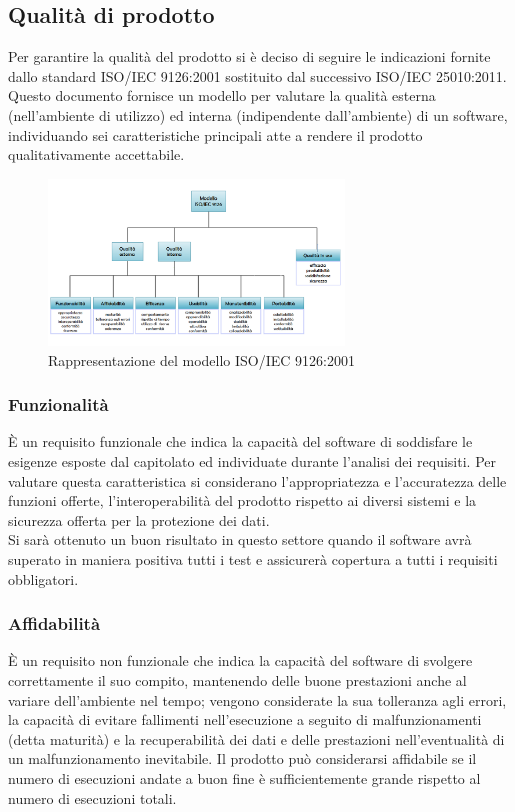 \subsection{Qualità di prodotto}
Per garantire la qualità del prodotto si è deciso di seguire le indicazioni fornite dallo standard ISO/IEC 9126:2001 sostituito dal successivo ISO/IEC 25010:2011. Questo documento fornisce un modello per valutare la qualità esterna (nell’ambiente di utilizzo) ed interna (indipendente dall’ambiente) di un software, individuando sei caratteristiche principali atte a rendere il prodotto qualitativamente accettabile.

\begin{figure}[h]
  \centering
    \includegraphics[width=0.7\textwidth]{./images/ISO-IEC_9126}
  \caption{Rappresentazione del modello ISO/IEC 9126:2001}
  \label{fig:ISO-IEC_9126}
\end{figure}


\subsubsection{Funzionalità}
È un requisito funzionale che indica la capacità del software di soddisfare le esigenze esposte dal capitolato ed individuate durante l’analisi dei requisiti. Per valutare questa caratteristica si considerano l'appropriatezza e l'accuratezza delle funzioni offerte, l'interoperabilità del prodotto rispetto ai diversi sistemi e la sicurezza offerta per la protezione dei dati.\\ 
Si sarà ottenuto un buon risultato in questo settore quando il software avrà superato in maniera positiva tutti i test e assicurerà copertura a tutti i requisiti obbligatori.

\subsubsection{Affidabilità}
È un requisito non funzionale che indica la capacità del software di svolgere correttamente il suo compito, mantenendo delle buone prestazioni anche al variare dell'ambiente nel tempo; vengono considerate la sua tolleranza agli errori, la capacità di evitare fallimenti nell’esecuzione a seguito di malfunzionamenti (detta maturità) e la recuperabilità dei dati e delle prestazioni nell'eventualità di un malfunzionamento inevitabile. Il prodotto può considerarsi affidabile se il numero di esecuzioni andate a buon fine è sufficientemente grande rispetto al numero di esecuzioni totali.

